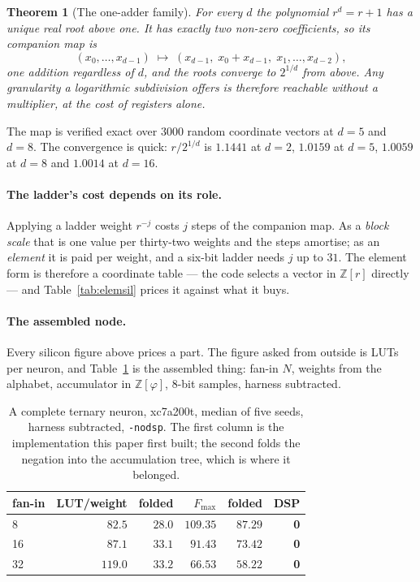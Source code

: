 \documentclass[11pt]{article}
\newtheorem{theorem}{Theorem}
\theoremstyle{definition}
\begin{document}
\begin{theorem}[The one-adder family]\label{thm:oneadder}
For every $d$ the polynomial $r^{d}=r+1$ has a unique real root above one. It
has exactly two non-zero coefficients, so its companion map is
\[
  (x_0,\dots,x_{d-1}) \;\mapsto\; (x_{d-1},\; x_0+x_{d-1},\; x_1,\dots,x_{d-2}),
\]
\emph{one addition} regardless of $d$, and the roots converge to $2^{1/d}$ from
above. Any granularity a logarithmic subdivision offers is therefore reachable
without a multiplier, at the cost of registers alone.
\end{theorem}

The map is verified exact over $3000$ random coordinate vectors at $d=5$ and
$d=8$. The convergence is quick: $r/2^{1/d}$ is $1.1441$ at $d=2$, $1.0159$ at
$d=5$, $1.0059$ at $d=8$ and $1.0014$ at $d=16$.

\paragraph{The ladder's cost depends on its role.} Applying a ladder weight
$r^{-j}$ costs $j$ steps of the companion map. As a \emph{block scale} that is
one value per thirty-two weights and the steps amortise; as an \emph{element} it
is paid per weight, and a six-bit ladder needs $j$ up to $31$. The element form
is therefore a coordinate table --- the code selects a vector in
$\mathbb{Z}[r]$ directly --- and Table~\ref{tab:elemsil} prices it against what
it buys.

\paragraph{The assembled node.} Every silicon figure above prices a part. The
figure asked from outside is LUTs per neuron, and Table~\ref{tab:node} is the
assembled thing: fan-in $N$, weights from the alphabet, accumulator in
$\mathbb{Z}[\varphi]$, 8-bit samples, harness subtracted.

\begin{table}[t]\centering
\caption{A complete ternary neuron, xc7a200t, median of five seeds, harness
subtracted, \texttt{-nodsp}. The first column is the implementation this paper
first built; the second folds the negation into the accumulation tree, which is
where it belonged.}
\label{tab:node}
\begin{tabular}{lrrrrr}
\toprule
fan-in & LUT/weight & folded & $F_{\max}$ & folded & DSP \\
\midrule
8  & $82.5$ & $\mathbf{28.0}$ & $109.35$ & $87.29$ & \textbf{0} \\
16 & $87.1$ & $\mathbf{33.1}$ & $91.43$ & $73.42$ & \textbf{0} \\
32 & $119.0$ & $\mathbf{33.2}$ & $66.53$ & $58.22$ & \textbf{0} \\
\bottomrule
\end{tabular}
\end{table}
\end{document}
